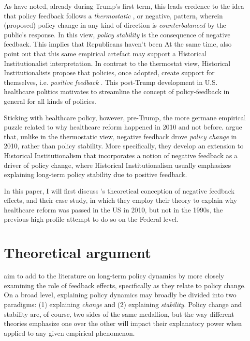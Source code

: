 \documentclass[11pt, xcolor=dvipsnames]{article}
\begin{document}
\begin{figure}[H]
    \sffamily
    
\end{figure}


\noindent As \textcite[][]{Busemeyer2019} have noted, already during Trump's first term, this leads credence to the idea that policy feedback follows a \textit{thermostatic} \parencite[][]{Wlezien1995}, or negative, pattern, wherein (proposed) policy change in any kind of direction is \textit{counterbalanced} by the public's response. In this view, \textit{policy stability} is the consequence of negative feedback. This implies that Republicans haven't been  At the same time, \textcite[][]{Busemeyer2019} also point out that this same empirical artefact may support a Historical Institutionalist interpretation. In contrast to the thermostat view, Historical Institutionalists propose that policies, once adopted, create support for themselves, i.e. \textit{positive feedback} \parencites[see e.g.][]{Pierson1993}{Pierson2000}. This post-Trump development in U.S. healthcare politics motivates \textcite[][]{Βusemeyer2019} to streamline the concept of policy-feedback in general for all kinds of policies.

Sticking with healthcare policy, however, pre-Trump, the more germane empirical puzzle related to why healthcare reform happened in 2010 and not before. \textcite[][]{Jacobs2014} argue that, unlike in the thermostatic view, negative feedback drove \textit{policy change} in 2010, rather than policy stability. More specifically, they develop an extension to Historical Institutionalism that incorporates a notion of negative feedback as a driver of policy change, where Historical Institutionalism usually emphasizes explaining long-term policy stability due to positive feedback. 

In this paper, I will first discuss \citeauthor[][]{Jacobs2014}'s \citeyear{Jacobs2014} theoretical conception of negative feedback effects, and their case study, in which they employ their theory to explain why healthcare reform was passed in the US in 2010, but not in the 1990s, the previous high-profile attempt to do so on the Federal level.


\section*{Theoretical argument}
\textcite[][]{Jacobs2014} aim to add to the literature on long-term policy dynamics by more closely examining the role of feedback effects, specifically as they relate to policy change. On a broad level, explaining policy dynamics may broadly be divided into two paradigms: (1) explaining \textit{change} and (2) explaining \textit{stability}. Policy change and stability are, of course, two sides of the same medallion, but the way different theories emphasize one over the other will impact their explanatory power when applied to any given empirical phenomenon. 
\end{document}
